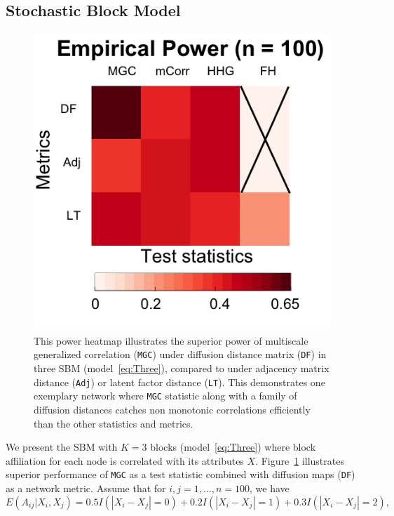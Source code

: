 \documentclass[11pt]{article}
\theoremstyle{definition}
\begin{document}
\subsection{Stochastic Block Model}

\begin{figure}
	\centering
	\includegraphics[width=0.4\paperwidth, height=0.4\paperwidth]{../Figure/ThreeSBM_results_simple.png}
	\caption{This power heatmap illustrates the superior power of multiscale generalized correlation (\texttt{MGC}) under diffusion distance matrix (\texttt{DF}) in three SBM (model~\ref{eq:Three}), compared to under adjacency matrix distance (\texttt{Adj}) or latent factor distance (\texttt{LT}). This demonstrates one exemplary network where \texttt{MGC} statistic along with a family of diffusion distances catches non monotonic correlations efficiently than the other statistics and metrics.}
	\label{fig:threeSBM}
\end{figure}
We present the SBM with $K=3$ blocks (model~\ref{eq:Three}) where block affiliation for each node is correlated with its attributes $X$. Figure~\ref{fig:threeSBM} illustrates superior performance of \texttt{MGC} as a test statistic combined with diffusion maps (\texttt{DF}) as a network metric. Assume that for $i,j = 1, \ldots , n = 100$, we have
\begin{equation}
\label{eq:Three}
E(A_{ij} | X_{i}, X_{j}) = 0.5 I(|X_{i} - X_{j}| = 0) + 0.2 I(|X_{i} - X_{j}| = 1) + 0.3 I(|X_{i} - X_{j}| = 2), 
\end{equation}
\end{document}

